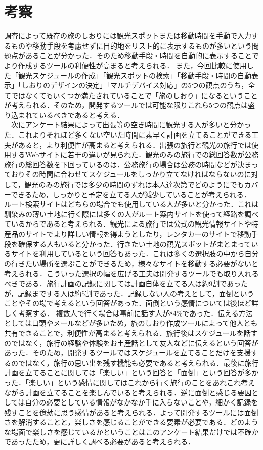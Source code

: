 \documentclass{funthesis}
\begin{document}
\section{考察}
調査によって既存の旅のしおりには観光スポットまたは移動時間を手動で入力するものや移動手段を考慮せずに目的地をリスト的に表示するものが多いという問題点があることが分かった．そのため移動手段・時間を自動的に表示することでより作成するツールの利便性が高まると考えられる．
また，今回比較に使用した「観光スケジュールの作成」「観光スポットの検索」「移動手段・時間の自動表示」「しおりのデザインの決定」「マルチデバイス対応」の5つの観点のうち，全てではなくてもいくつか満たされていることで「旅のしおり」になるということが考えられる．そのため，開発するツールでは可能な限りこれら5つの観点は盛り込まれているべきであると考える．\\
　次にアンケート結果によって出張等の空き時間に観光する人が多いと分かった．これよりそれほど多くない空いた時間に素早く計画を立てることができる工夫があると，より利便性が高まると考えられる．出張の旅行と観光の旅行では使用するWebサイトに若干の違いが見られた．観光のみの旅行での総回答数が公務旅行の総回答数を下回っているのは．公務旅行の場合は公務の時間などが決まっておりその時間に合わせてスケジュールをしっかり立てなければならないのに対して，観光のみの旅行では多少の時間のずれは本人達次第でどのようにでもカバーできるため，しっかりと予定を立てる人が減少していることが考えられる．
ルート検索サイトはどちらの場合でも使用している人が多いと分かった．これは馴染みの薄い土地に行く際には多くの人がルート案内サイトを使って経路を調べているからであると考えられる．観光による旅行では公式の観光情報サイトや特産品のサイトでより詳しい情報を得ようとしたり，レンタカーのサイトで移動手段を確保する人もいると分かった．行きたい土地の観光スポットがまとまっているサイトを利用しているという回答もあった．これは多くの選択肢の中から自分の行きたい場所を選ぶことができるため，様々なサイトを移動する必要がないと考えられる．こういった選択の幅を広げる工夫は開発するツールでも取り入れるべきである．旅行計画の記録に関しては計画自体を立てる人は約9割であったが，記録までする人は約5割であった．記録しない人の考えとして，面倒ということやその場で考えるという回答があった．面倒という感情については後ほど詳しく考察する．
複数人で行く場合は事前に話す人が84\%であった．伝える方法としては口頭やメールなどが多いため，旅のしおり作成ツールによって他人とも共有できることで，利便性が高まると考えられる．旅行後はスケジュールを話すのではなく，旅行の経験や体験をお土産話として友人などに伝えるという回答があった．そのため，開発するツールではスケジュールを立てることだけを支援するのではなく，旅行の思い出を残す機能も必要であると考えられる．最後に旅行計画を立てることに関しては「楽しい」という回答と「面倒」という回答が多かった．「楽しい」という感情に関してはこれから行く旅行のことをあれこれ考えながら計画を立てることを楽しんでいると考えられる．逆に面倒と感じる要因としては自分の必要としている情報がなかなか手に入らないことや，細かく記録を残すことを億劫に思う感情があると考えられる．よって開発するツールには面倒さを解消することと，楽しさを感じることができる要素が必要である．どのような場面で楽しさを感じているかということはこのアンケート結果だけでは不確かであったため，更に詳しく調べる必要があると考えられる．
\end{document}
